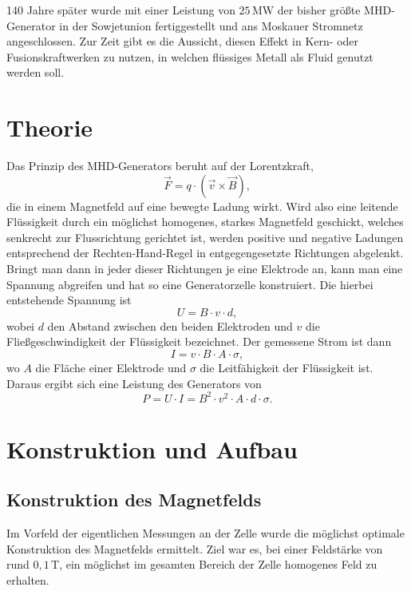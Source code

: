 \documentclass[11pt]{scrartcl}
\newcommand{\unit}[1]{\ensuremath{\,\mathrm{#1}}} %
\begin{document}
140 Jahre später wurde mit einer Leistung von $25\unit{MW}$ der bisher größte MHD-Generator in der Sowjetunion fertiggestellt und ans Moskauer Stromnetz angeschlossen. Zur Zeit gibt es die Aussicht, diesen Effekt in Kern- oder Fusionskraftwerken zu nutzen, in welchen flüssiges Metall als Fluid genutzt werden soll.

\section{Theorie}	%


Das Prinzip des MHD-Generators beruht auf der Lorentzkraft,
\begin{equation}
\vec{F} = q \cdot \left(\vec{v} \times \vec{B} \right),
\end{equation}
die in einem Magnetfeld auf eine bewegte Ladung wirkt. Wird also eine leitende Fl\"ussigkeit durch ein m\"oglichst homogenes, starkes Magnetfeld geschickt, welches senkrecht zur Flussrichtung gerichtet ist, werden positive und negative Ladungen entsprechend der Rechten-Hand-Regel in entgegengesetzte Richtungen abgelenkt. Bringt man dann in jeder dieser Richtungen je eine Elektrode an, kann man eine Spannung abgreifen und hat so eine Generatorzelle konstruiert. Die hierbei entstehende Spannung ist
\begin{equation}
U = B \cdot v \cdot d,
\end{equation}
wobei $d$ den Abstand zwischen den beiden Elektroden und $v$ die Flie\ss{}geschwindigkeit der Fl\"ussigkeit bezeichnet. Der gemessene Strom ist dann 
\begin{equation}
I = v \cdot B \cdot A \cdot \sigma,
\end{equation}
wo $A$ die Fl\"ache einer Elektrode und $\sigma$ die Leitf\"ahigkeit der Fl\"ussigkeit ist. Daraus ergibt sich eine Leistung des Generators von
\begin{equation}
P = U \cdot I = B^{2} \cdot v^{2} \cdot A \cdot d \cdot \sigma.
\end{equation}


\section{Konstruktion und Aufbau}

\subsection{Konstruktion des Magnetfelds}		%
Im Vorfeld der eigentlichen Messungen an der Zelle wurde die möglichst optimale Konstruktion des Magnetfelds ermittelt. Ziel war es, bei einer Feldstärke von rund $0,1 \unit{T}$, ein möglichst im gesamten Bereich der Zelle homogenes Feld zu erhalten.
\end{document}
